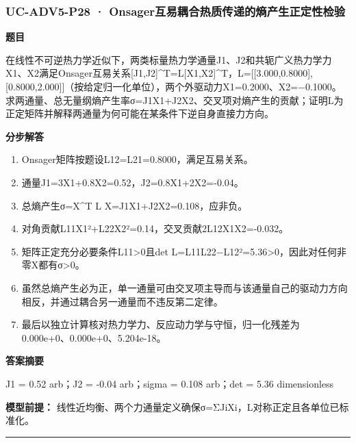 \documentclass[UTF8,11pt,a4paper]{ctexart}
\begin{document}
\subsubsection*{UC-ADV5-P28 · Onsager互易耦合热质传递的熵产生正定性检验}
\noindent\textbf{题目}\par
在线性不可逆热力学近似下，两类标量热力学通量J1、J2和共轭广义热力学力X1、X2满足Onsager互易关系[J1,J2]\textasciicircum{}T=L[X1,X2]\textasciicircum{}T，L=[[3.000,0.8000],[0.8000,2.000]]（按给定归一化单位），两个外驱动力X1=0.2000、X2=−0.1000。求两通量、总无量纲熵产生率σ=J1X1+J2X2、交叉项对熵产生的贡献；证明L为正定矩阵并解释两通量为何可能在某条件下逆自身直接力方向。\par
\medskip\noindent\textbf{分步解答}
\begin{enumerate}
\item Onsager矩阵按题设L12=L21=0.8000，满足互易关系。
\item 通量J1=3X1+0.8X2=0.52，J2=0.8X1+2X2=-0.04。
\item 总熵产生σ=X\textasciicircum{}T L X=J1X1+J2X2=0.108，应非负。
\item 对角贡献L11X1²+L22X2²=0.14，交叉贡献2L12X1X2=-0.032。
\item 矩阵正定充分必要条件L11>0且det L=L11L22−L12²=5.36>0，因此对任何非零X都有σ>0。
\item 虽然总熵产生必为正，单一通量可由交叉项主导而与该通量自己的驱动力方向相反，并通过耦合另一通量而不违反第二定律。
\item 最后以独立计算核对热力学力、反应动力学与守恒，归一化残差为 0.000e+0、0.000e+0、5.204e-18。
\end{enumerate}
\noindent\textbf{答案摘要}\par
J1 = 0.52 arb；J2 = -0.04 arb；sigma = 0.108 arb；det = 5.36 dimensionless\par
\noindent\textbf{模型前提：}
线性近均衡、两个力通量定义确保σ=ΣJiXi，L对称正定且各单位已标准化。\par
\medskip\hrule\medskip
{}
\end{document}
